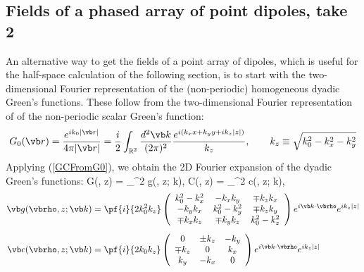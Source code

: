 \documentclass[letterpaper]{article}
\begin{document}
\subsection*{Fields of a phased array of point dipoles, take 2}

An alternative way to get the fields of a point array of dipoles,
which is useful for the half-space calculation of the following
section, is to start with the two-dimensional Fourier representation 
of the (non-periodic) homogeneous dyadic Green's functions.
These follow from the two-dimensional Fourier representation of 
of the non-periodic scalar Green's function:
$$ G_0(\vb r)=\frac{e^{ik_0 |\vb r|}}{4\pi |\vb r|}
   =
   \frac{i}{2}
   \int_{\mathbb R^2} \frac{d^2 \vb k}{(2\pi)^2}
    \frac{e^{i(k_x x + k_y y + ik_z|z|)}}{k_z},
   \qquad
   k_z\equiv \sqrt{k_0^2 - k_x^2 - k_y^2}
$$
Applying (\ref{GCFromG0}), 
we obtain the 2D Fourier expansion of the dyadic Green's functions:
{
\vb G(\vbrho, z)
 = \int_{^2}
      \vb g(\vbrho, z; \vb k),
\qquad
\vb C(\vbrho, z)
 = \int_{^2}
      \vb c(\vbrho, z; \vb k),
}
\begin{subequations}
\begin{align}
\vb g(\vbrho, z; \vb k)
&= \pf{i}{2k_0^2 k_z}
   \left(\begin{array}{ccc}
    k_0^2-k_x^2      & -k_x k_y     & \mp k_z k_x \\
    -k_y k_x         & k_0^2-k_y^2  & \mp k_z k_y \\
    \mp  k_x k_z     & \mp k_y k_z  & k_0^2-k_z^2
    \end{array}\right) e^{i\vb k \cdot \vbrho} e^{i k_z |z|}
\\[5pt]
\vb c(\vbrho, z; \vb k)
 &= \pf{i}{2k_0 k_z}
     \left(\begin{array}{ccc}
         0 & \pm k_z & -k_y \\
  \mp k_z  & 0       &  k_x \\
      k_y  & -k_x    &  0 
     \end{array}\right) e^{i\vb k \cdot \vbrho} e^{i k_z |z|}
\end{align}
\label{gc}
\end{subequations}
\end{document}
